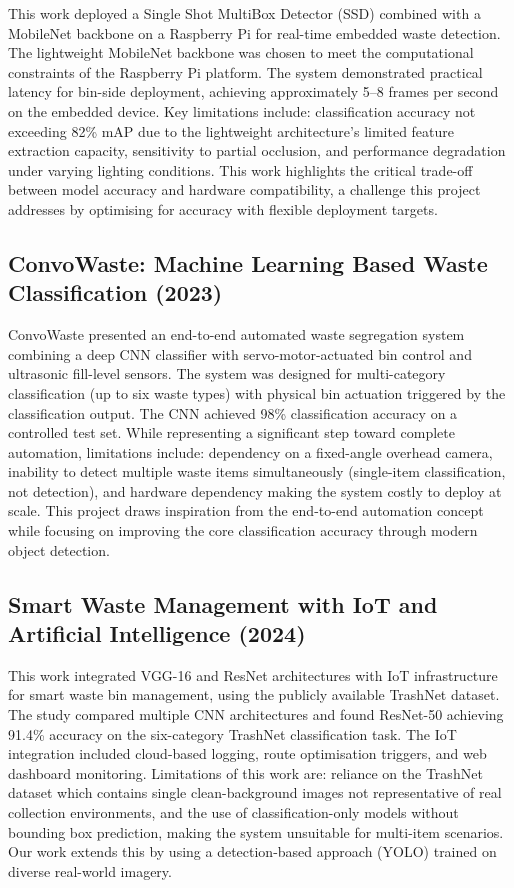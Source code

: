 This work \cite{ssd_mobilenet2021} deployed a Single Shot MultiBox Detector (SSD) combined with a MobileNet backbone on a Raspberry Pi for real-time embedded waste detection. The lightweight MobileNet backbone was chosen to meet the computational constraints of the Raspberry Pi platform. The system demonstrated practical latency for bin-side deployment, achieving approximately 5--8 frames per second on the embedded device. Key limitations include: classification accuracy not exceeding 82\% mAP due to the lightweight architecture's limited feature extraction capacity, sensitivity to partial occlusion, and performance degradation under varying lighting conditions. This work highlights the critical trade-off between model accuracy and hardware compatibility, a challenge this project addresses by optimising for accuracy with flexible deployment targets.

\subsection{ConvoWaste: Machine Learning Based Waste Classification (2023)}

ConvoWaste \cite{convowaste2023} presented an end-to-end automated waste segregation system combining a deep CNN classifier with servo-motor-actuated bin control and ultrasonic fill-level sensors. The system was designed for multi-category classification (up to six waste types) with physical bin actuation triggered by the classification output. The CNN achieved 98\% classification accuracy on a controlled test set. While representing a significant step toward complete automation, limitations include: dependency on a fixed-angle overhead camera, inability to detect multiple waste items simultaneously (single-item classification, not detection), and hardware dependency making the system costly to deploy at scale. This project draws inspiration from the end-to-end automation concept while focusing on improving the core classification accuracy through modern object detection.

\subsection{Smart Waste Management with IoT and Artificial Intelligence (2024)}

This work \cite{iot_ai2024} integrated VGG-16 and ResNet architectures with IoT infrastructure for smart waste bin management, using the publicly available TrashNet dataset. The study compared multiple CNN architectures and found ResNet-50 achieving 91.4\% accuracy on the six-category TrashNet classification task. The IoT integration included cloud-based logging, route optimisation triggers, and web dashboard monitoring. Limitations of this work are: reliance on the TrashNet dataset which contains single clean-background images not representative of real collection environments, and the use of classification-only models without bounding box prediction, making the system unsuitable for multi-item scenarios. Our work extends this by using a detection-based approach (YOLO) trained on diverse real-world imagery.


